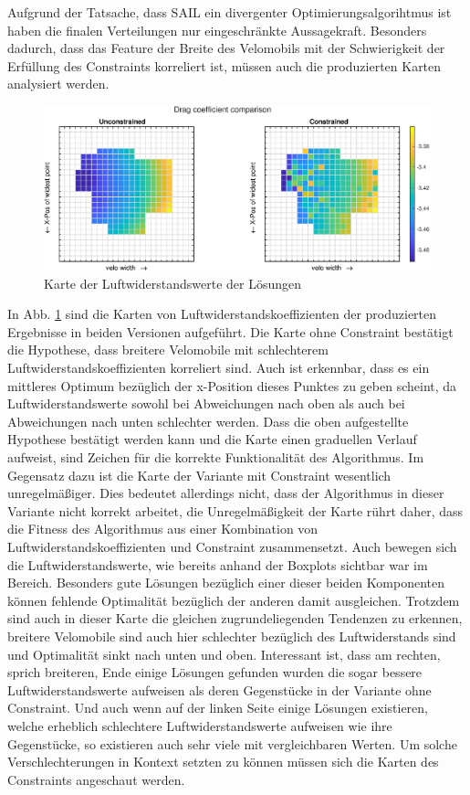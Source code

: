 Aufgrund der Tatsache, dass SAIL ein divergenter Optimierungsalgorihtmus ist haben die finalen Verteilungen nur eingeschränkte Aussagekraft.
Besonders dadurch, dass das Feature der Breite des Velomobils mit der Schwierigkeit der Erfüllung des Constraints korreliert ist, müssen auch die produzierten Karten analysiert werden.

\begin{figure}[h]
	\includegraphics[width=1\linewidth]{bilder/2pt500Samples/dragMapComparison}
	\caption{Karte der Luftwiderstandswerte der Lösungen}
	\label{fig:1stmapDrag}
\end{figure}

In Abb. \cref{fig:1stmapDrag} sind die Karten von Luftwiderstandskoeffizienten der produzierten Ergebnisse in beiden Versionen aufgeführt.
Die Karte ohne Constraint bestätigt die Hypothese, dass breitere Velomobile mit schlechterem Luftwiderstandskoeffizienten korreliert sind.
Auch ist erkennbar, dass es ein mittleres Optimum bezüglich der x-Position dieses Punktes zu geben scheint, da Luftwiderstandswerte sowohl bei Abweichungen nach oben als auch bei Abweichungen nach unten schlechter werden.
Dass die oben aufgestellte Hypothese bestätigt werden kann und die Karte einen graduellen Verlauf aufweist, sind Zeichen für die korrekte Funktionalität des Algorithmus.
Im Gegensatz dazu ist die Karte der Variante mit Constraint wesentlich unregelmäßiger.
Dies bedeutet allerdings nicht, dass der Algorithmus in dieser Variante nicht korrekt arbeitet, die Unregelmäßigkeit der Karte rührt daher, dass die Fitness des Algorithmus aus einer Kombination von Luftwiderstandskoeffizienten und Constraint zusammensetzt.
Auch bewegen sich die Luftwiderstandswerte, wie bereits anhand der Boxplots sichtbar war im Bereich.
Besonders gute Lösungen bezüglich einer dieser beiden Komponenten können fehlende Optimalität bezüglich der anderen damit ausgleichen.
Trotzdem sind auch in dieser Karte die gleichen zugrundeliegenden Tendenzen zu erkennen, breitere Velomobile sind auch hier schlechter bezüglich des Luftwiderstands sind und Optimalität sinkt nach unten und oben.
Interessant ist, dass am rechten, sprich breiteren, Ende einige Lösungen gefunden wurden die sogar bessere Luftwiderstandswerte aufweisen als deren Gegenstücke in der Variante ohne Constraint.
Und auch wenn auf der linken Seite einige Lösungen existieren, welche erheblich schlechtere Luftwiderstandswerte aufweisen wie ihre Gegenstücke, so existieren auch sehr viele mit vergleichbaren Werten.
Um solche Verschlechterungen in Kontext setzten zu können müssen sich die Karten des Constraints angeschaut werden.

